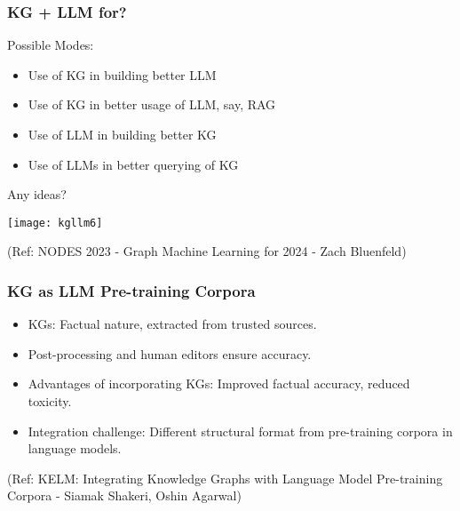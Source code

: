 \begin{frame}[fragile]\frametitle{KG + LLM for?}

Possible Modes:
\begin{itemize}
\item Use of KG in building better LLM
\item Use of KG in better usage of LLM, say, RAG
\item Use of LLM in building better KG
\item Use of LLMs in better querying of KG
\end{itemize}
	
Any ideas?

\begin{center}
\texttt{[image: kgllm6]}
\end{center}	

{\tiny (Ref: NODES 2023 - Graph Machine Learning for 2024 - Zach Bluenfeld)}


\end{frame}







\begin{frame}[fragile]\frametitle{KG as LLM Pre-training Corpora}

\begin{itemize}
\item KGs: Factual nature, extracted from trusted sources.
\item Post-processing and human editors ensure accuracy.
\item Advantages of incorporating KGs: Improved factual accuracy, reduced toxicity.
\item Integration challenge: Different structural format from pre-training corpora in language models.
\end{itemize}	

{\tiny (Ref: KELM: Integrating Knowledge Graphs with Language Model Pre-training Corpora - Siamak Shakeri, Oshin Agarwal)}
\end{frame}


